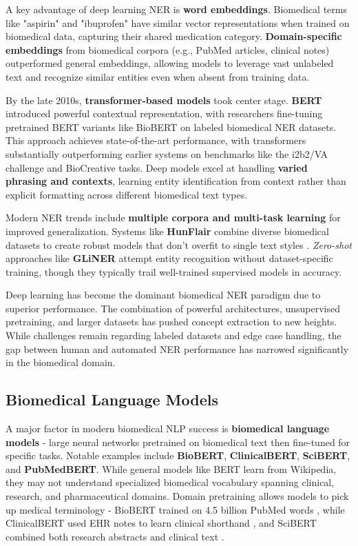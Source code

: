 A key advantage of deep learning NER is \textbf{word embeddings}. Biomedical terms like "aspirin" and "ibuprofen" have similar vector representations when trained on biomedical data, capturing their shared medication category. \textbf{Domain-specific embeddings} from biomedical corpora (e.g., PubMed articles, clinical notes) outperformed general embeddings, allowing models to leverage vast unlabeled text and recognize similar entities even when absent from training data.

By the late 2010s, \textbf{transformer-based models} took center stage. \textbf{BERT} introduced powerful contextual representation, with researchers fine-tuning pretrained BERT variants like BioBERT on labeled biomedical NER datasets. This approach achieves state-of-the-art performance, with transformers substantially outperforming earlier systems on benchmarks like the i2b2/VA challenge and BioCreative tasks. Deep models excel at handling \textbf{varied phrasing and contexts}, learning entity identification from context rather than explicit formatting across different biomedical text types.

Modern NER trends include \textbf{multiple corpora and multi-task learning} for improved generalization. Systems like \textbf{HunFlair} combine diverse biomedical datasets to create robust models that don't overfit to single text styles \parencite{Weber2023}. \emph{Zero-shot} approaches like \textbf{GLiNER} \parencite{Stenetorp2024} attempt entity recognition without dataset-specific training, though they typically trail well-trained supervised models in accuracy.

Deep learning has become the dominant biomedical NER paradigm due to superior performance. The combination of powerful architectures, unsupervised pretraining, and larger datasets has pushed concept extraction to new heights. While challenges remain regarding labeled datasets and edge case handling, the gap between human and automated NER performance has narrowed significantly in the biomedical domain.

\subsection{Biomedical Language Models}

A major factor in modern biomedical NLP success is \textbf{biomedical language models} - large neural networks pretrained on biomedical text then fine-tuned for specific tasks. Notable examples include \textbf{BioBERT}, \textbf{ClinicalBERT}, \textbf{SciBERT}, and \textbf{PubMedBERT}. While general models like BERT learn from Wikipedia, they may not understand specialized biomedical vocabulary spanning clinical, research, and pharmaceutical domains. Domain pretraining allows models to pick up medical terminology - BioBERT trained on 4.5 billion PubMed words \parencite{Lee_2019}, while ClinicalBERT used EHR notes to learn clinical shorthand \parencite{huang2020clinicalbertmodelingclinicalnotes}, and SciBERT combined both research abstracts and clinical text \parencite{beltagy2019scibertpretrainedlanguagemodel}.

